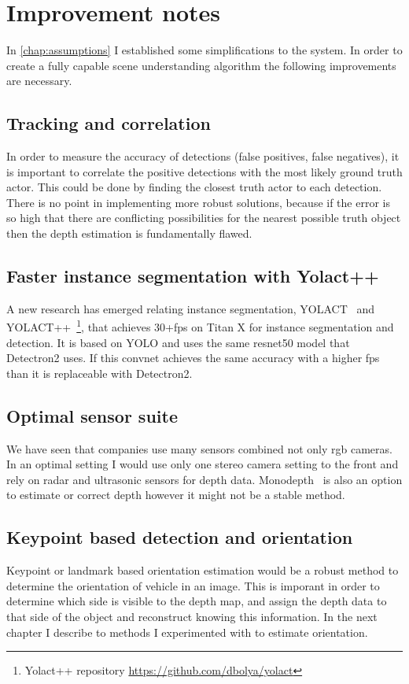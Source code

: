 \chapter{Improvement notes}
\label{chap:improvement}
In \autoref{chap:assumptions} I established some simplifications to the system.
In order to create a fully capable scene understanding algorithm the following
improvements are necessary.

\section{Tracking and correlation}
In order to measure the accuracy of detections (false positives, false
negatives), it is important to correlate the positive detections with the most
likely ground truth actor. This could be done by finding the closest truth actor
to each detection. There is no point in implementing more robust solutions,
because if the error is so high that there are conflicting possibilities for the
nearest possible truth object then the depth estimation is fundamentally flawed.

\section{Faster instance segmentation with Yolact++}
A new research has emerged relating instance segmentation,
YOLACT~\cite{yolact-iccv2019} and YOLACT++~\cite{yolact-plus-arxiv2019}\footnote{
Yolact++ repository \url{https://github.com/dbolya/yolact}}, that achieves
30+fps on Titan X for instance segmentation and detection. It is based on YOLO
and uses the same resnet50 model that Detectron2 uses. If this convnet achieves
the same accuracy with a higher fps than it is replaceable with Detectron2.

\section{Optimal sensor suite}
We have seen that companies use many sensors combined not only rgb cameras. In
an optimal setting I would use only one stereo camera setting to the front and
rely on radar and ultrasonic sensors for depth data.
Monodepth~\cite{monodepth17} is also an option to estimate or correct depth
however it might not be a stable method.

\section{Keypoint based detection and orientation}
Keypoint or landmark based orientation estimation would be a robust method to
determine the orientation of vehicle in an image. This is imporant in order to
determine which side is visible to the depth map, and assign the depth data to
that side of the object and reconstruct knowing this information. In the next
chapter I describe to methods I experimented with to estimate orientation.

